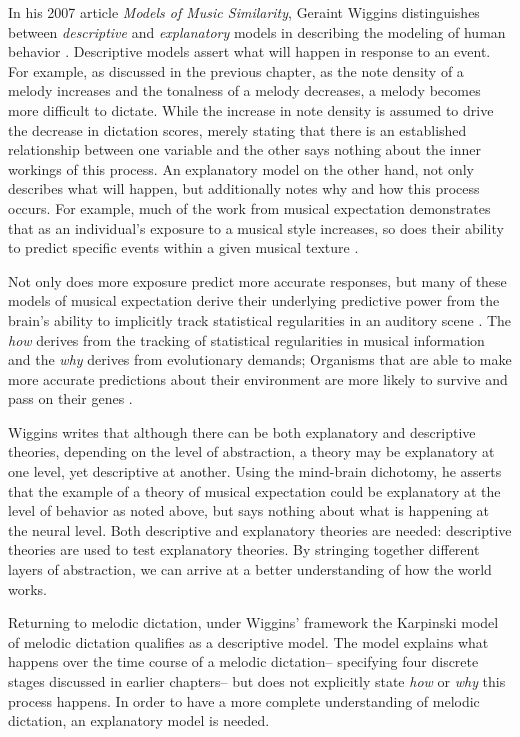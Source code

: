 \documentclass[12pt,]{book}
\begin{document}
In his 2007 article \emph{Models of Music Similarity}, Geraint Wiggins distinguishes between \emph{descriptive} and \emph{explanatory} models in describing the modeling of human behavior \citep{wigginsModelsMusicalSimilarity2007}.
Descriptive models assert what will happen in response to an event.
For example, as discussed in the previous chapter, as the note density of a melody increases and the tonalness of a melody decreases, a melody becomes more difficult to dictate.
While the increase in note density is assumed to drive the decrease in dictation scores, merely stating that there is an established relationship between one variable and the other says nothing about the inner workings of this process.
An explanatory model on the other hand, not only describes what will happen, but additionally notes why and how this process occurs.
For example, much of the work from musical expectation demonstrates that as an individual's exposure to a musical style increases, so does their ability to predict specific events within a given musical texture \citep{pearceStatisticalLearningProbabilistic2018a}.

Not only does more exposure predict more accurate responses, but many of these models of musical expectation derive their underlying predictive power from the brain's ability to implicitly track statistical regularities in an auditory scene \citep{saffranStatisticalLearningTone1999, margulisRepeatHowMusic2014}.
The \emph{how} derives from the tracking of statistical regularities in musical information and the \emph{why} derives from evolutionary demands; Organisms that are able to make more accurate predictions about their environment are more likely to survive and pass on their genes \citep{huronSweetAnticipation2006}.

Wiggins writes that although there can be both explanatory and descriptive theories, depending on the level of abstraction, a theory may be explanatory at one level, yet descriptive at another.
Using the mind-brain dichotomy, he asserts that the example of a theory of musical expectation could be explanatory at the level of behavior as noted above, but says nothing about what is happening at the neural level.
Both descriptive and explanatory theories are needed: descriptive theories are used to test explanatory theories.
By stringing together different layers of abstraction, we can arrive at a better understanding of how the world works.

Returning to melodic dictation, under Wiggins' framework the Karpinski model of melodic dictation \citep{karpinskiAuralSkillsAcquisition2000, karpinskiModelMusicPerception1990} qualifies as a descriptive model.
The model explains what happens over the time course of a melodic dictation-- specifying four discrete stages discussed in earlier chapters-- but does not explicitly state \emph{how} or \emph{why} this process happens.
In order to have a more complete understanding of melodic dictation, an explanatory model is needed.
\end{document}
